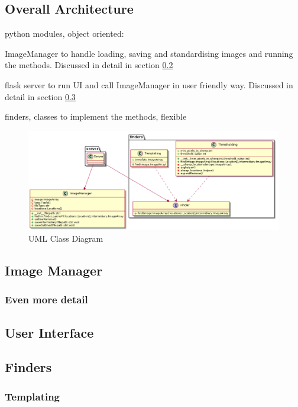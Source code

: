 \subsection{Overall Architecture}

python modules, object oriented:

ImageManager to handle loading, saving and standardising images and running the methods. Discussed in detail in section \ref{ImageManger}

flask server to run UI and call ImageManager in user friendly way. Discussed in detail in section \ref{FlaskServer}

finders, classes to implement the methods, flexible

\begin{figure}
    \centering
    \includegraphics[width=\textwidth]{diagrams/uml.png}
    \caption{UML Class Diagram}
    \label{fig:uml}
\end{figure}

\subsection{Image Manager}
\label{ImageManger}

\subsubsection{Even more detail}

\subsection{User Interface}
\label{FlaskServer}

\subsection{Finders}
\subsubsection{Templating}
